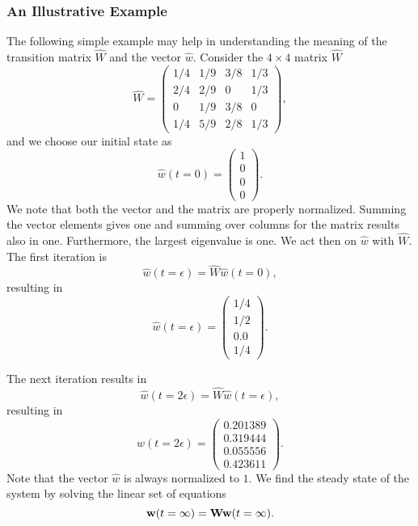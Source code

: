 \subsubsection{An Illustrative Example}
The following simple example may help in understanding the meaning of 
the transition matrix $\hat{W}$ and the vector $\hat{w}$.
Consider the $4\times 4$ matrix $\hat{W}$
\[
   \hat{W} = \left(\begin{array}{cccc} 1/4 & 1/9 & 3/8 & 1/3 \\                   
                                       2/4 & 2/9 & 0 & 1/3\\                   
                                       0   & 1/9 & 3/8 & 0\\
                                       1/4 & 5/9&  2/8 & 1/3 \end{array} \right),
\]
and we choose our initial state as 
\[
\hat{w}(t=0)=  \left(\begin{array}{c} 1\\                   
                                 0\\
                                 0 \\                   
                                 0 \end{array} \right).
\]
We note that both the vector and the matrix are properly normalized. Summing the vector elements gives one and
summing over columns for the matrix results also in one.  Furthermore, the largest eigenvalue is one.
We act then on $\hat{w}$ with $\hat{W}$.
The first iteration is
\[
   \hat{w}(t=\epsilon) = \hat{W}\hat{w}(t=0),
\]   
resulting in
\[
\hat{w}(t=\epsilon)=  \left(\begin{array}{c} 1/4\\                   
                                1/2 \\
                                0.0 \\                   
                                1/4 \end{array} \right).
\]

The next iteration results in 
\[
   \hat{w}(t=2\epsilon) = \hat{W}\hat{w}(t=\epsilon),
\]   
resulting in
\[
\hat{w}(t=2\epsilon)=  \left(\begin{array}{c} 0.201389\\
   0.319444 \\
   0.055556 \\
   0.423611 \end{array} \right).
\]
Note that the vector $\hat{w}$ is always normalized to $1$. 
We find the steady state of the system by solving the linear set of equations
\[ {\bf w}(t=\infty) = {\bf Ww}(t=\infty). \]

